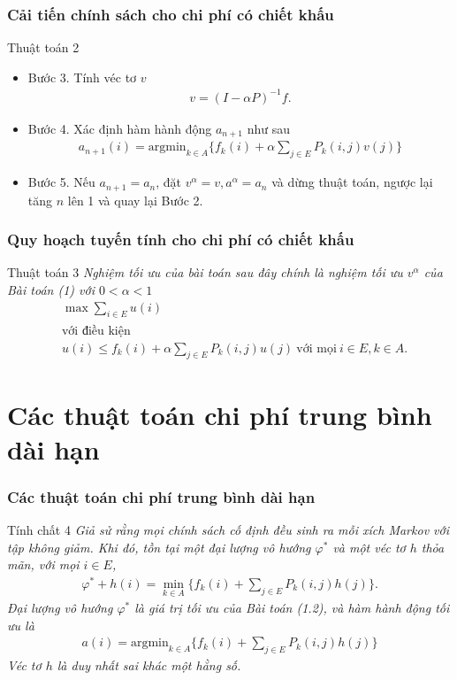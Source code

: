 \documentclass[12pt]{beamer}
\begin{document}
\begin{frame}
	\frametitle{Cải tiến chính sách cho chi phí có
		chiết khấu}
	\begin{exampleblock}{Thuật toán 2}
		\begin{itemize}	
			\item
			Bước 3. Tính véc tơ $v$
			\begin{align*}
			v=(I-\alpha P)^{-1}f.
			\end{align*}
			
			\item
			Bước 4. Xác định hàm hành động $a_{n+1}$ như sau
			\begin{align*}
			a_{n+1}(i)=\mathrm{argmin}_{k \in A}\{f_k(i)+\alpha \sum_{j \in E}P_k(i,j)v(j)\}
			\end{align*}
			
			\item
			Bước 5. Nếu $a_{n+1}=a_n$, đặt $v^\alpha =v, a^\alpha =a_n$ và dừng thuật toán, ngược lại tăng $n$ lên 1 và quay lại Bước 2. 
		\end{itemize}
	\end{exampleblock}
\end{frame}

\begin{frame}
	\frametitle{Quy hoạch tuyến tính cho chi phí có chiết khấu}
	\begin{exampleblock}{Thuật toán 3}
	\textit{ Nghiệm tối ưu của bài toán sau đây chính là nghiệm tối ưu $v^\alpha$ của Bài toán (1) với $0<\alpha<1$
		\begin{align*}
		&\max \sum _{i\in E}u(i)\\
		&\text{với điều kiện } \\
		&u(i)\leq f_k(i)+\alpha \sum_{j \in E}P_k(i,j)u(j) \ \text{với mọi} \ i \in E, k \in A.  
		\end{align*}
	} 
	\end{exampleblock}
\end{frame}

\section{Các thuật toán chi phí trung bình dài hạn}

\begin{frame}
	\frametitle{Các thuật toán chi phí trung bình dài hạn}
\begin{alertblock}{Tính chất 4}
	 \textit{Giả sử rằng mọi chính sách cố định đều sinh ra mỗi xích Markov với tập không giảm. Khi đó, tồn tại một đại lượng vô hướng $\varphi^*$ và một véc tơ $h$ thỏa mãn, với mọi $i \in E$,
		\begin{align}
		\varphi^*+h(i)=\underset{k \in A}{\min}\{f_k(i)+\sum_{j \in E}P_k(i,j)h(j)\}.
		\end{align}
		Đại lượng vô hướng $\varphi ^*$ là giá trị tối ưu của Bài toán (1.2), và hàm hành động tối ưu là
		\begin{align*}
		a(i)=\mathrm{argmin}_{k\in A}\{f_k(i)+\sum_{j\in E}P_k(i,j)h(j)\}
		\end{align*}
		Véc tơ $h$ là duy nhất sai khác một hằng số.
	} 
\end{alertblock}
\end{frame}
\end{document}
